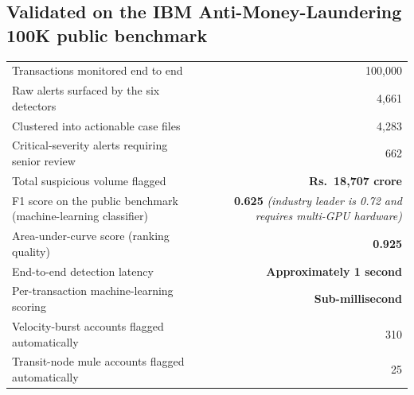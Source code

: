 \documentclass[10pt,a4paper]{article}
\begin{document}
\subsection*{Validated on the IBM Anti-Money-Laundering 100K public benchmark}
\begin{tabularx}{\columnwidth}{@{}Xr@{}}
\toprule
Transactions monitored end to end & 100{,}000 \\
Raw alerts surfaced by the six detectors & 4{,}661 \\
Clustered into actionable case files & 4{,}283 \\
Critical-severity alerts requiring senior review & 662 \\
Total suspicious volume flagged & \textbf{Rs.~18{,}707 crore} \\
F1 score on the public benchmark (machine-learning classifier) & \textbf{0.625} \textit{\textcolor{muted}{(industry leader is 0.72 and requires multi-GPU hardware)}} \\
Area-under-curve score (ranking quality) & \textbf{0.925} \\
End-to-end detection latency & \textbf{Approximately 1 second} \\
Per-transaction machine-learning scoring & \textbf{Sub-millisecond} \\
Velocity-burst accounts flagged automatically & 310 \\
Transit-node mule accounts flagged automatically & 25 \\
\bottomrule
\end{tabularx}
\end{document}
